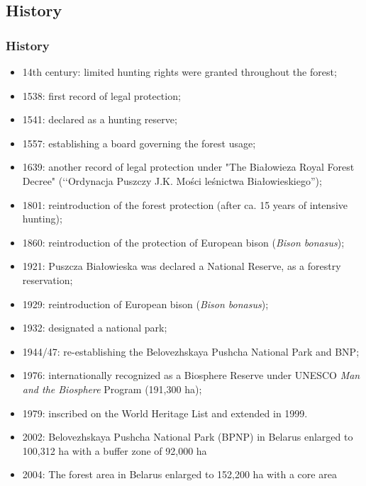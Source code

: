 \documentclass[pdflatex,compress,8pt,
	xcolor={dvipsnames,dvipsnames,svgnames,x11names,table},
	hyperref={colorlinks = true,
	breaklinks = true, urlcolor = NavyBlue, breaklinks = true}]{beamer}
\begin{document}
\subsection{History}
\begin{frame}\frametitle{History}
\vspace{3em}
\small{\begin{itemize}
	\item 14th century: limited hunting rights were granted throughout the forest;
	\item 1538: first record of legal protection;
	\item 1541: declared as a hunting reserve;
	\item 1557: establishing a board governing the forest usage;
	\item 1639: another record of legal protection under "The Białowieza Royal Forest Decree" (‘‘Ordynacja Puszczy J.K. Mości leśnictwa Białowieskiego'');
	\item 1801: reintroduction of the forest protection (after ca. 15 years of intensive hunting);
	\item 1860: reintroduction of the protection of European bison (\emph{Bison bonasus});
	\item 1921: Puszcza Białowieska was declared a National Reserve, as a forestry reservation;
	\item 1929: reintroduction of European bison (\emph{Bison bonasus});
	\item 1932: designated a national park;
	\item 1944/47: re-establishing the Belovezhskaya Pushcha National Park and BNP;
	\item 1976: internationally recognized as a Biosphere Reserve under UNESCO \emph{Man and the Biosphere} Program (191,300 ha);
	\item 1979: inscribed on the World Heritage List and extended in 1999.
	\item 2002: Belovezhskaya Pushcha National Park (BPNP) in Belarus enlarged to 100,312 ha with a buffer zone of 92,000 ha
	\item 2004: The forest area in Belarus enlarged to 152,200 ha with a core area	
\end{itemize}}
\end{frame}
\end{document}
